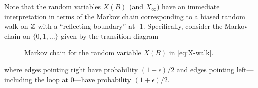 
  Note that the random variables
  $X(B)$ (and $X_\infty$) have an immediate interpretation in terms
  of the Markov chain corresponding to a biased random walk on $\mathbb{Z}$
  with a ``reflecting boundary'' at -1. Specifically, consider the
  Markov chain on $\{0, 1, \ldots\}$ given by the transition diagram
  \begin{figure}
    \begin{center}
    \end{center}
    \caption{Markov chain for the random variable $X(B)$ in \eqref{eq:X-walk}.}
    \label{fig:X-walk}  
  \end{figure}
  where edges pointing right have probability $(1-\epsilon)/2$ and edges pointing left---including the loop at 0---have probability $(1+\epsilon)/2$.



